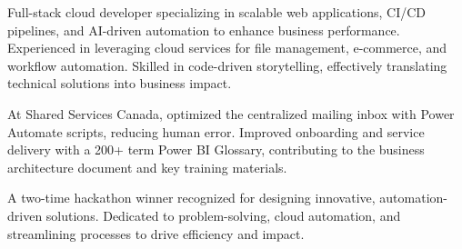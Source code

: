 
\begin{cvparagraph}

Full-stack cloud developer specializing in scalable web applications, CI/CD pipelines, and AI-driven automation to enhance business performance. Experienced in leveraging cloud services for file management, e-commerce, and workflow automation. Skilled in code-driven storytelling, effectively translating technical solutions into business impact.  

At Shared Services Canada, optimized the centralized mailing inbox with Power Automate scripts, reducing human error. Improved onboarding and service delivery with a 200+ term Power BI Glossary, contributing to the business architecture document and key training materials.  

A two-time hackathon winner recognized for designing innovative, automation-driven solutions. Dedicated to problem-solving, cloud automation, and streamlining processes to drive efficiency and impact.  

\end{cvparagraph}
